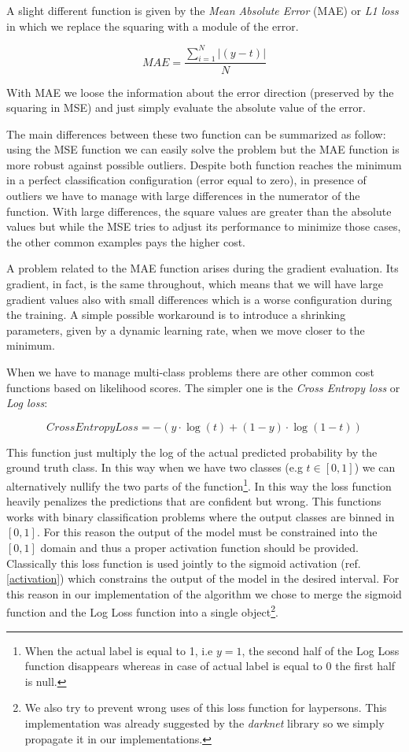 \documentclass{standalone}
\begin{document}
A slight different function is given by the \emph{Mean Absolute Error} (MAE) or \emph{L1 loss} in which we replace the squaring with a module of the error.

$$
MAE = \frac{\sum_{i=1}^{N}|\left( y - t \right)|}{N}
$$

With MAE we loose the information about the error direction (preserved by the squaring in MSE) and just simply evaluate the absolute value of the error.

The main differences between these two function can be summarized as follow: using the MSE function we can easily solve the problem but the MAE function is more robust against possible outliers.
Despite both function reaches the minimum in a perfect classification configuration (error equal to zero), in presence of outliers we have to manage with large differences in the numerator of the function.
With large differences, the square values are greater than the absolute values but while the MSE tries to adjust its performance to minimize those cases, the other common examples pays the higher cost.

A problem related to the MAE function arises during the gradient evaluation.
Its gradient, in fact, is the same throughout, which means that we will have large gradient values also with small differences which is a worse configuration during the training.
A simple possible workaround is to introduce a shrinking parameters, given by a dynamic learning rate, when we move closer to the minimum.

When we have to manage multi-class problems there are other common cost functions based on likelihood scores.
The simpler one is the \emph{Cross Entropy loss} or \emph{Log loss}:

$$
CrossEntropyLoss = -(y\cdot\log(t) + (1 - y)\cdot\log(1 - t))
$$

This function just multiply the log of the actual predicted probability by the ground truth class.
In this way when we have two classes (e.g $t \in [0, 1]$) we can alternatively nullify the two parts of the function\footnote{
  When the actual label is equal to 1, i.e $y=1$, the second half of the Log Loss function disappears whereas in case of actual label is equal to 0 the first half is null.
}.
In this way the loss function heavily penalizes the predictions that are confident but wrong.
This functions works with binary classification problems where the output classes are binned in $[0, 1]$.
For this reason the output of the model must be constrained into the $[0, 1]$ domain and thus a proper activation function should be provided.
Classically this loss function is used jointly to the sigmoid activation (ref. \ref{activation}) which constrains the output of the model in the desired interval.
For this reason in our implementation of the algorithm we chose to merge the sigmoid function and the Log Loss function into a single object\footnote{
  We also try to prevent wrong uses of this loss function for laypersons.
  This implementation was already suggested by the \emph{darknet} library so we simply propagate it in our implementations.
}.
\end{document}
